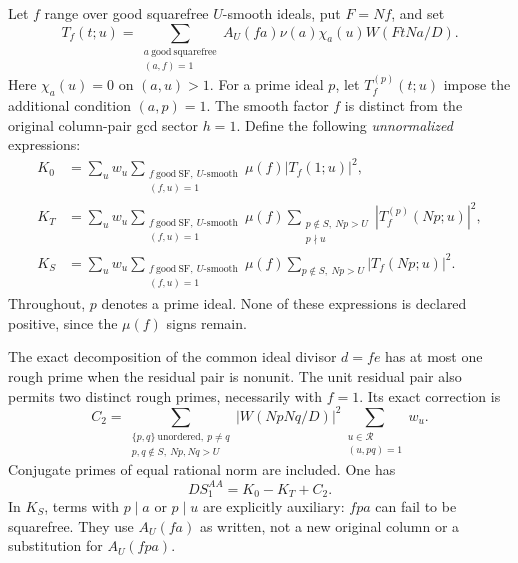 \documentclass[11pt]{article}
\theoremstyle{definition}\newtheorem{definition}[theorem]{Definition}
\theoremstyle{remark}\newtheorem{remark}[theorem]{Remark}
\begin{document}
Let $f$ range over good squarefree $U$-smooth ideals, put $F=Nf$, and set
\begin{equation}\label{rma:T}
 T_f(t;u)=\sum_{\substack{a\ \mathrm{good\ squarefree}\\(a,f)=1}}
 A_U(fa)\nu(a)\chi_a(u)W(FtNa/D).
\end{equation}
Here $\chi_a(u)=0$ on $(a,u)>1$. For a prime ideal $p$, let
$T_f^{(p)}(t;u)$ impose the additional condition $(a,p)=1$.
The smooth factor $f$ is distinct from the original column-pair gcd
sector $h=1$. Define the following \emph{unnormalized} expressions:
\begin{align}
 K_0&=\sum_u w_u\sum_{\substack{f\ \mathrm{good\ SF},\ U\text{-smooth}\\
                              (f,u)=1}}
                       \mu(f)|T_f(1;u)|^2,\label{rma:Kzero}\\
 K_T&=\sum_u w_u\sum_{\substack{f\ \mathrm{good\ SF},\ U\text{-smooth}\\
                              (f,u)=1}}\mu(f)
       \sum_{\substack{p\notin S,\ Np>U\\p\nmid u}}
                       |T_f^{(p)}(Np;u)|^2,\label{rma:KT}\\
 K_S&=\sum_u w_u\sum_{\substack{f\ \mathrm{good\ SF},\ U\text{-smooth}\\
                              (f,u)=1}}\mu(f)
       \sum_{p\notin S,\ Np>U}|T_f(Np;u)|^2.\label{rma:KS}
\end{align}
Throughout, $p$ denotes a prime ideal. None of these expressions is
declared positive, since the $\mu(f)$ signs remain.

The exact decomposition of the common ideal divisor $d=fe$ has at most
one rough prime when the residual pair is nonunit. The unit residual
pair also permits two distinct rough primes, necessarily with $f=1$.
Its exact correction is
\begin{equation}\label{rma:Ctwo}
 C_2=\sum_{\substack{\{p,q\}\ \mathrm{unordered},\ p\ne q\\
                     p,q\notin S,\ Np,Nq>U}}
 |W(NpNq/D)|^2\sum_{\substack{u\in\mathcal R\\(u,pq)=1}}w_u.
\end{equation}
Conjugate primes of equal rational norm are included. One has
\begin{equation}\label{rma:exact}
 DS_1^{AA}=K_0-K_T+C_2.
\end{equation}
In $K_S$, terms with $p\mid a$ or $p\mid u$ are explicitly auxiliary:
$ fpa$ can fail to be squarefree. They use $A_U(fa)$ as written, not a
new original column or a substitution for $A_U(fpa)$.
\end{document}
